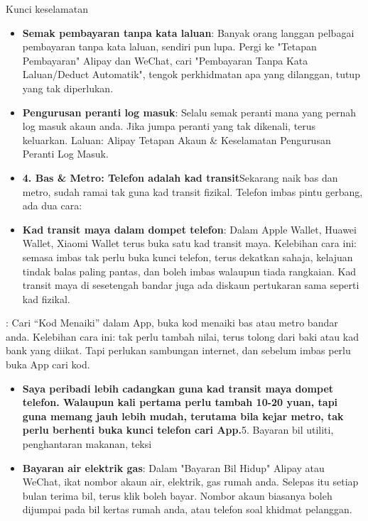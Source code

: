 Kunci keselamatan


\begin{itemize}
  \item \textbf{Semak pembayaran tanpa kata laluan}: Banyak orang langgan pelbagai pembayaran tanpa kata laluan, sendiri pun lupa. Pergi ke "Tetapan Pembayaran" Alipay dan WeChat, cari "Pembayaran Tanpa Kata Laluan/Deduct Automatik", tengok perkhidmatan apa yang dilanggan, tutup yang tak diperlukan.
  \item \textbf{Pengurusan peranti log masuk}: Selalu semak peranti mana yang pernah log masuk akaun anda. Jika jumpa peranti yang tak dikenali, terus keluarkan. Laluan: Alipay Tetapan Akaun \& Keselamatan Pengurusan Peranti Log Masuk.
  \item \textbf{4. Bas \& Metro: Telefon adalah kad transit}Sekarang naik bas dan metro, sudah ramai tak guna kad transit fizikal. Telefon imbas pintu gerbang, ada dua cara:
  \item \textbf{Kad transit maya dalam dompet telefon}: Dalam Apple Wallet, Huawei Wallet, Xiaomi Wallet terus buka satu kad transit maya. Kelebihan cara ini: semasa imbas tak perlu buka kunci telefon, terus dekatkan sahaja, kelajuan tindak balas paling pantas, dan boleh imbas walaupun tiada rangkaian. Kad transit maya di sesetengah bandar juga ada diskaun pertukaran sama seperti kad fizikal.
\end{itemize}


: Cari “Kod Menaiki” dalam App, buka kod menaiki bas atau metro bandar anda. Kelebihan cara ini: tak perlu tambah nilai, terus tolong dari baki atau kad bank yang diikat. Tapi perlukan sambungan internet, dan sebelum imbas perlu buka App cari kod.

\begin{itemize}
  \item \textbf{Saya peribadi lebih cadangkan guna kad transit maya dompet telefon. Walaupun kali pertama perlu tambah 10-20 yuan, tapi guna memang jauh lebih mudah, terutama bila kejar metro, tak perlu berhenti buka kunci telefon cari App.}5. Bayaran bil utiliti, penghantaran makanan, teksi
  \item \textbf{Bayaran air elektrik gas}: Dalam "Bayaran Bil Hidup" Alipay atau WeChat, ikat nombor akaun air, elektrik, gas rumah anda. Selepas itu setiap bulan terima bil, terus klik boleh bayar. Nombor akaun biasanya boleh dijumpai pada bil kertas rumah anda, atau telefon soal khidmat pelanggan.
\end{itemize}


